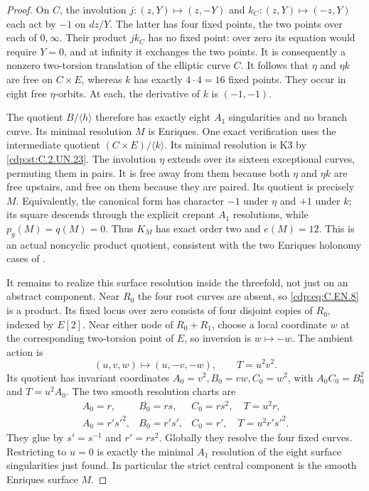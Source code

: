 \begin{proof}
On $C$, the involution $j:(z,Y)\mapsto(z,-Y)$
and $k_C:(z,Y)\mapsto(-z,Y)$ each act by $-1$
on $dz/Y$. The latter has four fixed points,
the two points over each of $0,\infty$.
Their product $jk_C$ has no fixed point:
over zero its equation would require $Y=0$,
and at infinity it exchanges the two points.
It is consequently a nonzero two-torsion
translation of the elliptic curve $C$.
It follows that $\eta$ and $\eta k$ are
free on $C\times E$, whereas $k$ has exactly
$4\cdot4=16$ fixed points. They occur in
eight free $\eta$-orbits. At each, the
derivative of $k$ is $(-1,-1)$.

The quotient $B/\langle h\rangle$ therefore
has exactly eight $A_1$ singularities and
no branch curve. Its minimal resolution
$M$ is Enriques. One exact verification
uses the intermediate quotient
$(C\times E)/\langle k\rangle$. Its
minimal resolution is K3 by \ref{cdp:st:C.2.UN.23}.
The involution $\eta$ extends over its
sixteen exceptional curves, permuting
them in pairs. It is free away from
them because both $\eta$ and $\eta k$
are free upstairs, and free on them
because they are paired. Its quotient
is precisely $M$. Equivalently, the
canonical form has character $-1$
under $\eta$ and $+1$ under $k$;
its square descends through the
explicit crepant $A_1$ resolutions,
while $p_g(M)=q(M)=0$. Thus $K_M$
has exact order two and $e(M)=12$.
This is an actual noncyclic product
quotient, consistent with the two
Enriques holonomy cases of
\cite[Theorem~2.1 and Example~2.3]{Yoshihara1995}.

It remains to realize this surface resolution
inside the threefold, not just on an abstract
component. Near $R_0$ the four root curves
are absent, so \eqref{cdp:eq:C.EN.8} is a product.
Its fixed locus over zero consists of four
disjoint copies of $R_0$, indexed by $E[2]$.
Near either node of $R_0+R_1$, choose a
local coordinate $w$ at the corresponding
two-torsion point of $E$, so inversion is
$w\mapsto-w$. The ambient action is
\[
 (u,v,w)\longmapsto(u,-v,-w),\qquad
                         T=u^2v^2 .
                                                               \tag{C.EN.14}\label{cdp:eq:C.EN.14}
\]
Its quotient has invariant coordinates
$A_0=v^2,B_0=vw,C_0=w^2$, with
$A_0C_0=B_0^2$ and $T=u^2A_0$.
The two smooth resolution charts are
\[
 \begin{array}{lll}
 A_0=r,&B_0=rs,&C_0=rs^2,\quad T=u^2r,\\
 A_0=r's'^2,&B_0=r's',&C_0=r',\quad T=u^2r's'^2 .
 \end{array}                                             \tag{C.EN.15}\label{cdp:eq:C.EN.15}
\]
They glue by $s'=s^{-1}$ and $r'=rs^2$.
Globally they resolve the four fixed
curves. Restricting to $u=0$ is exactly
the minimal $A_1$ resolution of the
eight surface singularities just found.
In particular the strict central component
is the smooth Enriques surface $M$.


\end{proof}
